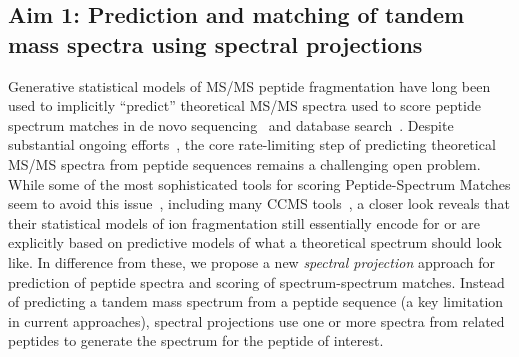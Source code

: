 \documentclass[arial,11pt]{article}
\begin{document}

\subsection{Aim 1: Prediction and matching of tandem mass spectra using spectral projections}

Generative statistical models of MS/MS peptide fragmentation have long been used to implicitly ``predict'' theoretical MS/MS spectra used to score peptide spectrum matches in de novo sequencing~\cite{dancik99} and database search~\cite{kim09msdict,kim10cidetd}. Despite substantial ongoing efforts~\cite{wysocki03,zhang04,paizs05}, the core rate-limiting step of predicting theoretical MS/MS spectra from peptide sequences remains a challenging open problem. While some of the most sophisticated tools for scoring Peptide-Spectrum Matches seem to avoid this issue~\cite{kall07,kim08}, including many CCMS tools~\cite{kim08,kim09msdict,frank09ranks,kim10cidetd,wang11}, a closer look reveals that their statistical models of ion fragmentation still essentially encode for or are explicitly based on predictive models of what a theoretical spectrum should look like. In difference from these, we propose a new {\em spectral projection} approach for prediction of peptide spectra and scoring of spectrum-spectrum matches. Instead of predicting a tandem mass spectrum from a peptide sequence (a key limitation in current approaches), spectral projections use one or more spectra from related peptides to generate the spectrum for the peptide of interest.
\end{document}

